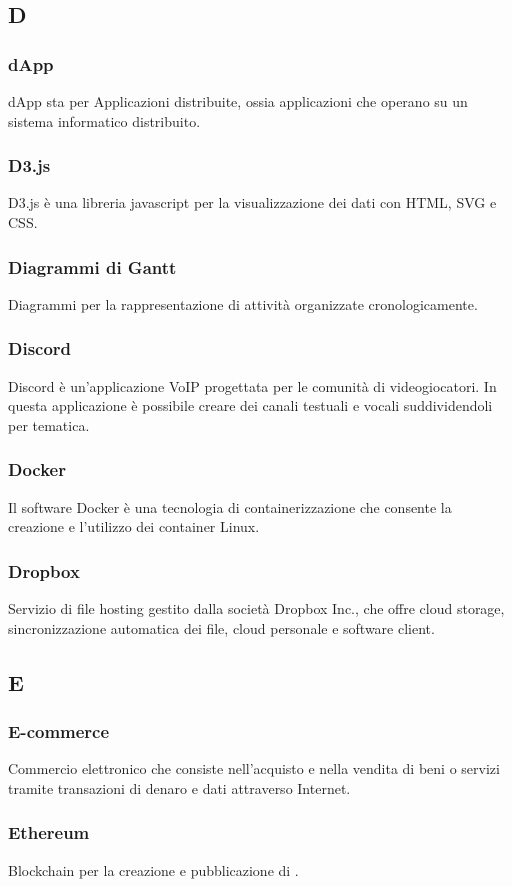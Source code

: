 \subsection*{D}
\subsubsection*{dApp} dApp sta per Applicazioni distribuite, ossia applicazioni che operano su un sistema informatico distribuito.
\subsubsection*{D3.js} D3.js è una libreria javascript per la visualizzazione dei dati con HTML, SVG e CSS.
\subsubsection*{Diagrammi di Gantt} Diagrammi per la rappresentazione di attività organizzate cronologicamente.
\subsubsection*{Discord} Discord è un’applicazione VoIP progettata per le comunità di videogiocatori. In questa applicazione è possibile creare dei canali testuali e vocali suddividendoli per tematica.
\subsubsection*{Docker} Il software Docker è una tecnologia di containerizzazione che consente la creazione e l’utilizzo dei container Linux.
\subsubsection*{Dropbox} Servizio di file hosting gestito dalla società Dropbox Inc., che offre cloud storage, sincronizzazione automatica dei file, cloud personale e software client.
\subsection*{E}
\subsubsection*{E-commerce} Commercio elettronico che consiste nell'acquisto e nella vendita di beni o servizi tramite transazioni di denaro e dati attraverso Internet.
\subsubsection*{Ethereum} Blockchain per la creazione e pubblicazione di .
